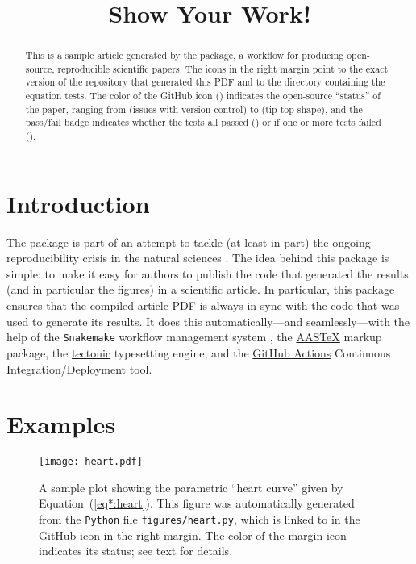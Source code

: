 \documentclass[modern]{aastex62}
\begin{document}
\title{Show Your Work!}

\author[\myORCID]{\myName}
\email{\myEmail}
\affil{\myAffil}

\begin{abstract}
    This is a sample article generated by the \showyourwork package, a workflow for producing open-source, reproducible scientific papers.
    The icons in the right margin point to the exact version of the repository that generated this PDF and
    to the directory containing the equation tests.
    The color of the GitHub icon (\GitHubIcon) indicates the open-source ``status'' of the paper, ranging from \GitHubIconRed (issues with version control) to \GitHubIconBlue (tip top shape), and the pass/fail badge indicates whether the tests all passed (\TestPassIcon) or if one or more tests failed (\TestFailIcon).
\end{abstract}

\section{Introduction}

The \showyourwork package is part of an attempt to tackle (at least in part) the ongoing reproducibility crisis in the natural sciences \citep[see, e.g.,][]{Baker2016}.
The idea behind this package is simple: to make it easy for authors to publish the code that generated the results (and in particular the figures) in a scientific article.
In particular, this package ensures that the compiled article PDF is always in sync with the code that was used to generate its results.
It does this automatically---and seamlessly---with the help of the \texttt{Snakemake} workflow management system \citep{Molder2021}, the \href{https://journals.aas.org/aastex-package-for-manuscript-preparation/}{AASTeX} markup package, the \href{https://github.com/tectonic-typesetting/tectonic}{tectonic} typesetting engine, and the \href{https://github.com/features/actions}{GitHub Actions} Continuous Integration/Deployment tool.

\section{Examples}

\begin{figure}[t!]
    \begin{centering}
        \texttt{[image: heart.pdf]}
        \caption{
            A sample plot showing the parametric ``heart curve'' given by Equation~(\ref{eq*:heart}).
            This figure was automatically generated from the \texttt{Python} file \texttt{figures/heart.py}, which is linked to in the GitHub icon in the right margin.
            The color of the margin icon indicates its status; see text for details.
        }
        \label{fig:heart}
    \end{centering}
\end{figure}
\end{document}
